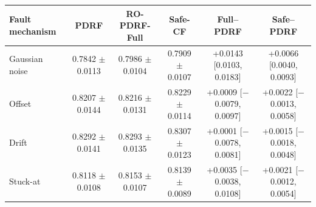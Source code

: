 \begin{tabular}{lccccc}
\toprule
Fault mechanism & PDRF & RO-PDRF-Full & Safe-CF & Full--PDRF & Safe--PDRF \\
\midrule
Gaussian noise & 0.7842 $\pm$ 0.0113 & 0.7986 $\pm$ 0.0104 & 0.7909 $\pm$ 0.0107 & +0.0143 [0.0103, 0.0183] & +0.0066 [0.0040, 0.0093] \\
Offset & 0.8207 $\pm$ 0.0144 & 0.8216 $\pm$ 0.0131 & 0.8229 $\pm$ 0.0114 & +0.0009 [$-$0.0079, 0.0097] & +0.0022 [$-$0.0013, 0.0058] \\
Drift & 0.8292 $\pm$ 0.0141 & 0.8293 $\pm$ 0.0135 & 0.8307 $\pm$ 0.0123 & +0.0001 [$-$0.0078, 0.0081] & +0.0015 [$-$0.0018, 0.0048] \\
Stuck-at & 0.8118 $\pm$ 0.0108 & 0.8153 $\pm$ 0.0107 & 0.8139 $\pm$ 0.0089 & +0.0035 [$-$0.0038, 0.0108] & +0.0021 [$-$0.0012, 0.0054] \\
\bottomrule
\end{tabular}
